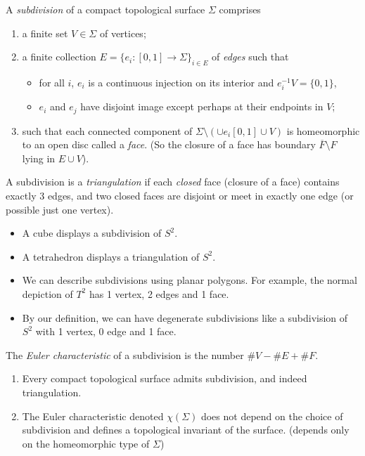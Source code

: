 \leavevmode
\begin{definition}{}{}
    A \textit{subdivision} of a compact topological surface \(\Sigma\) comprises
    \begin{enumerate}
        \item a finite set \(V \in \Sigma\) of vertices;
        \item a finite collection \(E = \{e_i: [0,1] \to \Sigma\}_{i\in E}\) of \textit{edges} such that
        \begin{itemize}
            \item for all \(i\), \(e_i\) is a continuous injection on its interior and \(e_i^{-1}V = \{0,1\}\),
            \item \(e_i\) and \(e_j\) have disjoint image except perhaps at their endpoints in \(V\);
        \end{itemize}
        \item such that each connected component of \(\Sigma \setminus (\cup e_i[0,1]\cup V)\) is homeomorphic to an open disc called a \textit{face}. (So the closure of a face has boundary \(\overline{F}\setminus F\) lying in \(E\cup V\)).
    \end{enumerate}

    A subdivision is a \textit{triangulation} if each \textit{closed} face (closure of a face) contains exactly 3 edges, and two closed faces are disjoint or meet in exactly one edge (or possible just one vertex).
\end{definition}
\begin{example}
    \leavevmode
    \begin{itemize}
        \item A cube displays a subdivision of \(S^2\).
        \item A tetrahedron displays a triangulation of \(S^2\).
        \item We can describe subdivisions using planar polygons. For example, the normal depiction of \(T^2\) has 1 vertex, 2 edges and 1 face.
        \item By our definition, we can have degenerate subdivisions like a subdivision of \(S^2\) with 1 vertex, 0 edge and 1 face.
    \end{itemize}
\end{example}
\begin{definition}{}{}
    The \textit{Euler characteristic} of a subdivision is the number \(\# V - \# E + \# F\).
\end{definition}
\begin{theorem}{}{}
    \leavevmode
    \begin{enumerate}
        \item Every compact topological surface admits subdivision, and indeed triangulation.
        \item The Euler characteristic denoted \(\chi (\Sigma)\) does not depend on the choice of subdivision and defines a topological invariant of the surface. (depends only on the homeomorphic type of \(\Sigma\))
    \end{enumerate}
\end{theorem}
